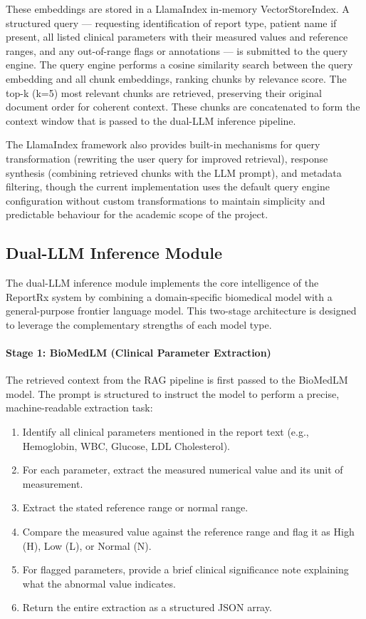 \documentclass[12pt,a4paper]{report}
\begin{document}
These embeddings are stored in a LlamaIndex in-memory VectorStoreIndex. A structured query --- requesting identification of report type, patient name if present, all listed clinical parameters with their measured values and reference ranges, and any out-of-range flags or annotations --- is submitted to the query engine. The query engine performs a cosine similarity search between the query embedding and all chunk embeddings, ranking chunks by relevance score. The top-k (k=5) most relevant chunks are retrieved, preserving their original document order for coherent context. These chunks are concatenated to form the context window that is passed to the dual-LLM inference pipeline.

The LlamaIndex framework also provides built-in mechanisms for query transformation (rewriting the user query for improved retrieval), response synthesis (combining retrieved chunks with the LLM prompt), and metadata filtering, though the current implementation uses the default query engine configuration without custom transformations to maintain simplicity and predictable behaviour for the academic scope of the project.

\subsection{Dual-LLM Inference Module}
The dual-LLM inference module implements the core intelligence of the ReportRx system by combining a domain-specific biomedical model with a general-purpose frontier language model. This two-stage architecture is designed to leverage the complementary strengths of each model type.

\paragraph{Stage 1: BioMedLM (Clinical Parameter Extraction)}
The retrieved context from the RAG pipeline is first passed to the BioMedLM model. The prompt is structured to instruct the model to perform a precise, machine-readable extraction task:

\begin{enumerate}
    \item Identify all clinical parameters mentioned in the report text (e.g., Hemoglobin, WBC, Glucose, LDL Cholesterol).
    \item For each parameter, extract the measured numerical value and its unit of measurement.
    \item Extract the stated reference range or normal range.
    \item Compare the measured value against the reference range and flag it as High (H), Low (L), or Normal (N).
    \item For flagged parameters, provide a brief clinical significance note explaining what the abnormal value indicates.
    \item Return the entire extraction as a structured JSON array.
\end{enumerate}
\end{document}
